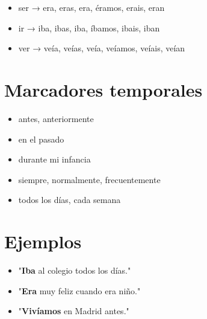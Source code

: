 \documentclass[a4paper,11pt]{article}
\begin{document}
\begin{itemize}

  \item ser → era, eras, era, éramos, erais, eran

  \item ir → iba, ibas, iba, íbamos, ibais, iban

  \item ver → veía, veías, veía, veíamos, veíais, veían

\end{itemize}

\vspace{0.2cm}

\section{Marcadores temporales}

\begin{itemize}

  \item antes, anteriormente

  \item en el pasado

  \item durante mi infancia

  \item siempre, normalmente, frecuentemente

  \item todos los días, cada semana

\end{itemize}

\vspace{0.2cm}

\section{Ejemplos}

\begin{itemize}

  \item "\textbf{Iba} al colegio todos los días."

  \item "\textbf{Era} muy feliz cuando era niño."

  \item "\textbf{Vivíamos} en Madrid antes."

\end{itemize}

\vspace{0.2cm}
\end{document}
